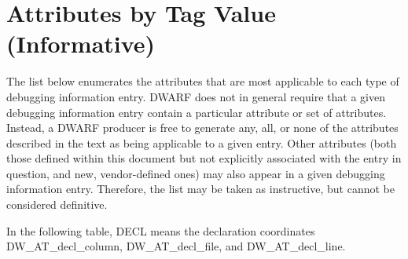 \chapter[Attributes by Tag (Informative)]{Attributes by Tag Value (Informative)}
\label{chap:attributesbytagvalueinformative}

The list below enumerates the attributes that are
most applicable to each type of debugging information
entry. DWARF does not in general require that a given
debugging information entry contain a particular attribute
or set of attributes. Instead, a DWARF producer is free to
generate any, all, or none of the attributes described in the
text as being applicable to a given entry. Other attributes
(both those defined within this document but not explicitly
associated with the entry in question, and new, vendor-defined
ones) may also appear in a given debugging information
entry. Therefore, the list may be taken as instructive, but
cannot be considered definitive.  

In the following table,
DECL means the declaration coordinates DW\-\_AT\-\_decl\-\_column,
DW\-\_AT\-\_decl\-\_file, and DW\-\_AT\-\_decl\-\_line.


